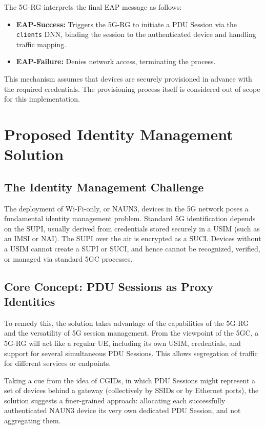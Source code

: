The \ac{5G-RG} interprets the final \ac{EAP} message as follows:

\begin{itemize}
    \item \textbf{\ac{EAP}-Success:} Triggers the 5G-RG to initiate a \ac{PDU} Session via the \texttt{clients} \ac{DNN}, binding the session to the authenticated device and handling traffic mapping.
    \item \textbf{\ac{EAP}-Failure:} Denies network access, terminating the process.
\end{itemize}

This mechanism assumes that devices are securely provisioned in advance with the required credentials. The provisioning process itself is considered out of scope for this implementation.

\section{Proposed Identity Management Solution}

\subsection{The Identity Management Challenge}

The deployment of Wi-Fi-only, or \ac{NAUN3}, devices in the \ac{5G} network poses a fundamental identity management problem. Standard \ac{5G} identification depends on the \ac{SUPI}, usually derived from credentials stored securely in a \ac{USIM} (such as an \ac{IMSI} or \ac{NAI}). The \ac{SUPI} over the air is encrypted as a \ac{SUCI}. Devices without a \ac{USIM} cannot create a \ac{SUPI} or \ac{SUCI}, and hence cannot be recognized, verified, or managed via standard \ac{5GC} processes.

\subsection{Core Concept: \ac{PDU} Sessions as Proxy Identities}

To remedy this, the solution takes advantage of the capabilities of the \ac{5G-RG} and the versatility of 5G session management. From the viewpoint of the \ac{5GC}, a \ac{5G-RG} will act like a regular \ac{UE}, including its own \ac{USIM}, credentials, and support for several simultaneous \ac{PDU} Sessions. This allows segregation of traffic for different services or endpoints.

Taking a cue from the idea of \acp{CGID}, in which \ac{PDU} Sessions might represent a set of devices behind a gateway (collectively by \acp{SSID} or by Ethernet ports), the solution suggests a finer-grained approach: allocating each successfully authenticated \ac{NAUN3} device its very own dedicated \ac{PDU} Session, and not aggregating them.


